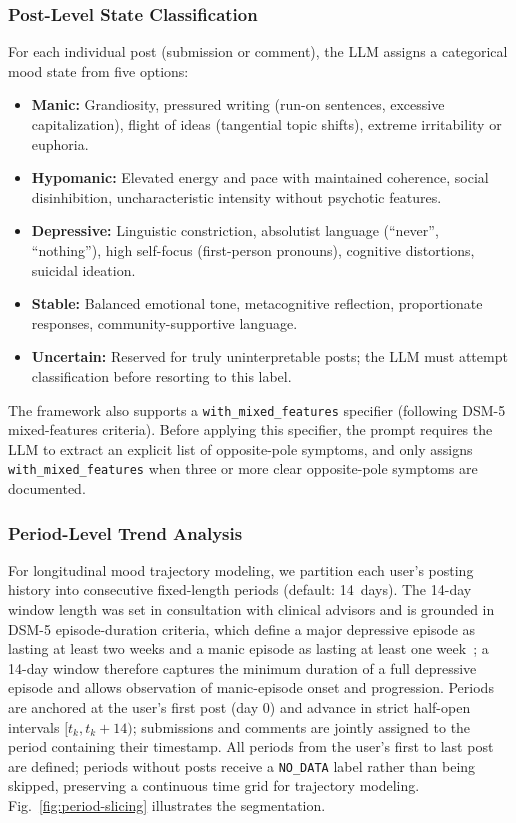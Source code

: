 \documentclass[runningheads]{llncs}
\begin{document}
\subsubsection{Post-Level State Classification}
For each individual post (submission or comment), the LLM assigns a categorical mood state from five options:

\begin{itemize}
\item \textbf{Manic:} Grandiosity, pressured writing (run-on sentences, excessive capitalization), flight of ideas (tangential topic shifts), extreme irritability or euphoria.
\item \textbf{Hypomanic:} Elevated energy and pace with maintained coherence, social disinhibition, uncharacteristic intensity without psychotic features.
\item \textbf{Depressive:} Linguistic constriction, absolutist language (``never'', ``nothing''), high self-focus (first-person pronouns), cognitive distortions, suicidal ideation.
\item \textbf{Stable:} Balanced emotional tone, metacognitive reflection, proportionate responses, community-supportive language.
\item \textbf{Uncertain:} Reserved for truly uninterpretable posts; the LLM must attempt classification before resorting to this label.
\end{itemize}

The framework also supports a \texttt{with\_mixed\_features} specifier (following DSM-5 mixed-features criteria). Before applying this specifier, the prompt requires the LLM to extract an explicit list of opposite-pole symptoms, and only assigns \texttt{with\_mixed\_features} when three or more clear opposite-pole symptoms are documented.

\subsubsection{Period-Level Trend Analysis}
For longitudinal mood trajectory modeling, we partition each user's posting history into consecutive fixed-length periods (default: 14~days). The 14-day window length was set in consultation with clinical advisors and is grounded in DSM-5 episode-duration criteria, which define a major depressive episode as lasting at least two weeks and a manic episode as lasting at least one week~\cite{apa2013dsm5}; a 14-day window therefore captures the minimum duration of a full depressive episode and allows observation of manic-episode onset and progression. Periods are anchored at the user's first post (day 0) and advance in strict half-open intervals $[t_k, t_k + 14)$; submissions and comments are jointly assigned to the period containing their timestamp. All periods from the user's first to last post are defined; periods without posts receive a \texttt{NO\_DATA} label rather than being skipped, preserving a continuous time grid for trajectory modeling. Fig.~\ref{fig:period-slicing} illustrates the segmentation.
\end{document}
